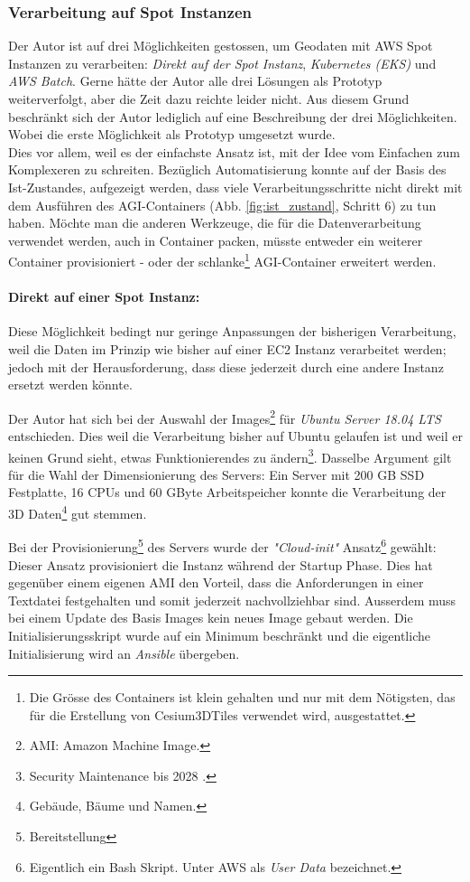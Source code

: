 \subsubsection{Verarbeitung auf Spot Instanzen}
Der Autor ist auf drei Möglichkeiten gestossen, um Geodaten mit AWS Spot Instanzen zu verarbeiten: \emph{Direkt auf der Spot Instanz}, \emph{Kubernetes (EKS)} und \emph{AWS Batch}. Gerne hätte der Autor alle drei Lösungen als Prototyp weiterverfolgt, aber die Zeit dazu reichte leider nicht. Aus diesem Grund beschränkt sich der Autor lediglich auf eine Beschreibung der drei Möglichkeiten. Wobei die erste Möglichkeit als Prototyp umgesetzt wurde.\\
Dies vor allem, weil es der einfachste Ansatz ist, mit der Idee vom Einfachen zum Komplexeren zu schreiten.
Bezüglich Automatisierung konnte auf der Basis des Ist-Zustandes, aufgezeigt werden, dass viele Verarbeitungsschritte nicht direkt mit dem Ausführen des AGI-Containers (Abb. \ref{fig:ist_zustand}, Schritt 6) zu tun haben. Möchte man die anderen Werkzeuge, die für die Datenverarbeitung verwendet werden, auch in Container packen, müsste entweder ein weiterer Container provisioniert - oder der schlanke\footnote{Die Grösse des Containers ist klein gehalten und nur mit dem Nötigsten, das für die Erstellung von Cesium3DTiles verwendet wird, ausgestattet.} AGI-Container erweitert werden.

\paragraph{Direkt auf einer Spot Instanz:}
Diese Möglichkeit bedingt nur geringe Anpassungen der bisherigen Verarbeitung, weil die Daten im Prinzip wie bisher auf einer EC2 Instanz verarbeitet werden; jedoch mit der Herausforderung, dass diese jederzeit durch eine andere Instanz ersetzt werden könnte.

Der Autor hat sich bei der Auswahl der Images\footnote{AMI: Amazon Machine Image.} für \emph{Ubuntu Server 18.04 LTS} entschieden. Dies weil die Verarbeitung bisher auf Ubuntu gelaufen ist und weil er keinen Grund sieht, etwas Funktionierendes zu ändern\footnote{Security Maintenance bis 2028 \cite{Ubuntu2020}.}. Dasselbe Argument gilt für die Wahl der Dimensionierung des Servers: Ein Server mit 200 GB SSD Festplatte, 16 CPUs und 60 GByte Arbeitspeicher konnte die Verarbeitung der 3D Daten\footnote{Gebäude, Bäume und Namen.} gut stemmen.

Bei der Provisionierung\footnote{Bereitstellung} des Servers wurde der \emph{"Cloud-init"} Ansatz\footnote{Eigentlich ein Bash Skript. Unter AWS als \emph{User Data} bezeichnet.} gewählt: Dieser Ansatz provisioniert die Instanz während der Startup Phase. Dies hat gegenüber einem eigenen AMI den Vorteil, dass die Anforderungen in einer Textdatei festgehalten und somit jederzeit nachvollziehbar sind. Ausserdem muss bei einem Update des Basis Images kein neues Image gebaut werden.
Die Initialisierungsskript wurde auf ein Minimum beschränkt und die eigentliche Initialisierung wird an \emph{Ansible} übergeben. 

